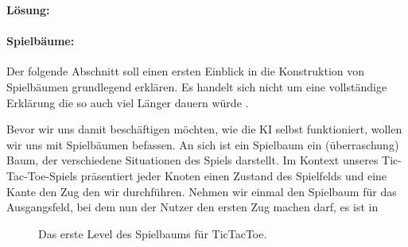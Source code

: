 \documentclass[table]{sopra-base}
\makeatletter
\newenvironment{solution}{\null\par\noindent\textbf{\textcolor{sob@col@uulm@cs}{Lösung:}}\newline\bgroup\color{black}\slshape\ignorespaces}{\egroup}
\makeatother
\begin{document}
\begin{solution}
\paragraph{Spielbäume:}
\begin{center}
    Der folgende Abschnitt soll einen ersten Einblick in die Konstruktion von Spielbäumen grundlegend erklären. Es handelt sich nicht um eine vollständige Erklärung die so auch viel Länger dauern würde \Laughey.
\end{center}
Bevor wir uns damit beschäftigen möchten, wie die KI selbst funktioniert, wollen wir uns mit Spielbäumen befassen. An sich ist ein Spielbaum ein (überraschung) Baum, der verschiedene Situationen des Spiels darstellt. Im Kontext unseres Tic-Tac-Toe-Spiels präsentiert jeder Knoten einen Zustand des Spielfelds und eine Kante den Zug den wir durchführen. Nehmen wir einmal den Spielbaum für das Ausgangsfeld, bei dem nun der Nutzer den ersten Zug machen darf, es ist in 
\begin{figure}[tbhp]
    \centering{}
    \caption{Das erste Level des Spielbaums für TicTacToe.}
\end{figure}

\end{solution}
\end{document}
